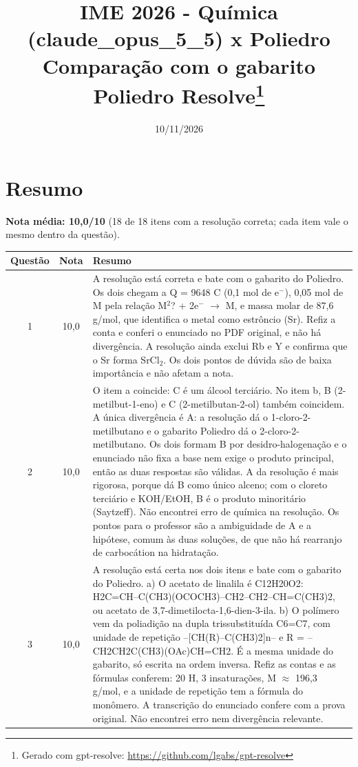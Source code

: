 \documentclass{article}%
\title{IME 2026 {-} Química (claude\_opus\_5\_5) x Poliedro\\[4pt]\large Comparação com o gabarito Poliedro Resolve\thanks{Gerado com gpt-resolve: \url{https://github.com/lgabs/gpt-resolve}}}%
\date{10/11/2026}%
\begin{document}
%
\normalsize%
\maketitle%
\section*{Resumo}\textbf{Nota média: 10,0/10} (18 de 18 itens com a resolução correta; cada item vale o mesmo dentro da questão).\par\medskip%
\begin{longtable}{@{}c c p{}@{}}\toprule Questão & Nota & Resumo \\ \midrule
1 & 10,0 & A resolução está correta e bate com o gabarito do Poliedro. Os dois chegam a Q = 9648 C (0,1 mol de e$^{-}$), 0,05 mol de M pela relação M$^2$? + 2e$^{-}$ $\to$ M, e massa molar de 87,6 g/mol, que identifica o metal como estrôncio (Sr). Refiz a conta e conferi o enunciado no PDF original, e não há divergência. A resolução ainda exclui Rb e Y e confirma que o Sr forma SrCl$_{2}$. Os dois pontos de dúvida são de baixa importância e não afetam a nota. \\
2 & 10,0 & O item a coincide: C é um álcool terciário. No item b, B (2{-}metilbut{-}1{-}eno) e C (2{-}metilbutan{-}2{-}ol) também coincidem. A única divergência é A: a resolução dá o 1{-}cloro{-}2{-}metilbutano e o gabarito Poliedro dá o 2{-}cloro{-}2{-}metilbutano. Os dois formam B por desidro{-}halogenação e o enunciado não fixa a base nem exige o produto principal, então as duas respostas são válidas. A da resolução é mais rigorosa, porque dá B como único alceno; com o cloreto terciário e KOH/EtOH, B é o produto minoritário (Saytzeff). Não encontrei erro de química na resolução. Os pontos para o professor são a ambiguidade de A e a hipótese, comum às duas soluções, de que não há rearranjo de carbocátion na hidratação. \\
3 & 10,0 & A resolução está certa nos dois itens e bate com o gabarito do Poliedro. a) O acetato de linalila é C12H20O2: H2C=CH--C(CH3)(OCOCH3)--CH2--CH2--CH=C(CH3)2, ou acetato de 3,7{-}dimetilocta{-}1,6{-}dien{-}3{-}ila. b) O polímero vem da poliadição na dupla trissubstituída C6=C7, com unidade de repetição --{[}CH(R)--C(CH3)2{]}n-- e R = --CH2CH2C(CH3)(OAc)CH=CH2. É a mesma unidade do gabarito, só escrita na ordem inversa. Refiz as contas e as fórmulas conferem: 20 H, 3 insaturações, M $\approx$ 196,3 g/mol, e a unidade de repetição tem a fórmula do monômero. A transcrição do enunciado confere com a prova original. Não encontrei erro nem divergência relevante. \\

\end{longtable}
\end{document}
